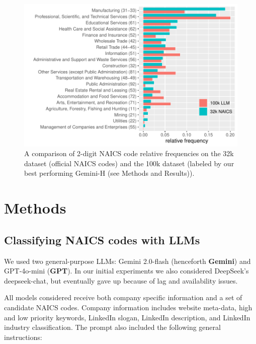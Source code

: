 \documentclass[fleqn,moreauthors,10pt]{ds_report}
\begin{document}
\begin{figure}[ht]\centering
	\includegraphics[width=\linewidth]{fig/distribution.pdf}
	\caption{A comparison of 2-digit NAICS code relative frequencies on the 32k dataset (official NAICS codes) and the 100k dataset (labeled by our best performing Gemini-H (see Methods and Results)).}
	\label{fig:distribution}
\end{figure}


\section*{Methods}

\subsection*{Classifying NAICS codes with LLMs}

We used two general-purpose LLMs: Gemini 2.0-flash (henceforth \textbf{Gemini}) and GPT-4o-mini (\textbf{GPT}). In our initial experiments we also considered DeepSeek's deepseek-chat, but eventually gave up because of lag and availability issues.

All models considered receive both company specific information and a set of candidate NAICS codes. Company information includes website meta-data, high and low priority keywords, LinkedIn slogan, LinkedIn description, and LinkedIn industry classification. The prompt also included the following general instructions:
\end{document}
